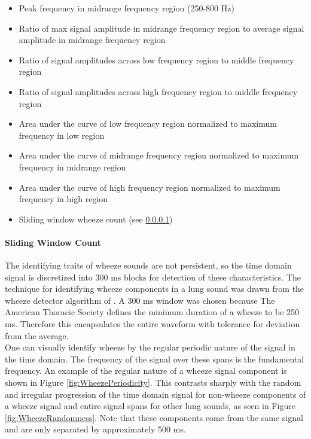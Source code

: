 \documentclass{article}
\begin{document}
\begin{itemize}[noitemsep,nolistsep]
\item
	Peak frequency in midrange frequency region (250-800 Hz)\\
\item
	Ratio of max signal amplitude in midrange frequency region to average signal amplitude in midrange frequency region\\
\item
	Ratio of signal amplitudes across low frequency region to middle frequency region\\
\item
	Ratio of signal amplitudes across high frequency region to middle frequency region\\
\item
	Area under the curve of low frequency region normalized to maximum frequency in low region\\
\item
	Area under the curve of midrange frequency region normalized to maximum frequency in midrange region\\
\item
	Area under the curve of high frequency region normalized to maximum frequency in high region\\
\item
	Sliding window wheeze count (see \ref{Wheeze Sliding Window})\\
\end{itemize}

\paragraph{Sliding Window Count}\label{Wheeze Sliding Window}

The identifying traits of wheeze sounds are not persistent, so the time domain signal is discretized into 300 ms blocks for detection of these characteristics. The technique for identifying wheeze components in a lung sound was drawn from the wheeze detector algorithm of \cite{Yi MEng}. A 300 ms window was chosen because The American Thoracic Society defines the minimum duration of a wheeze to be 250 ms. Therefore this encapsulates the entire waveform with tolerance for deviation from the average.\\

One can visually identify wheeze by the regular periodic nature of the signal in the time domain. The frequency of the signal over these spans is the fundamental frequency. An example of the regular nature of a wheeze signal component is shown in Figure \ref{fig:WheezePeriodicity}. This contrasts sharply with the random and irregular progression of the time domain signal for non-wheeze components of a wheeze signal and entire signal spans for other lung sounds, as seen in Figure \ref{fig:WheezeRandomness}. Note that these components come from the same signal and are only separated by approximately 500 ms. \\
\end{document}
